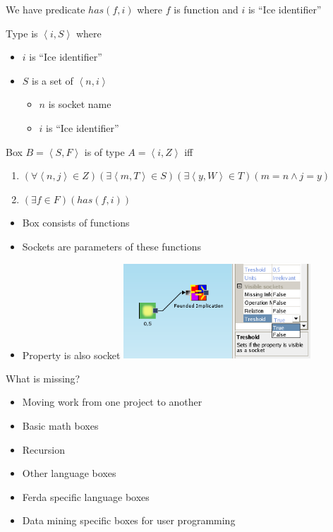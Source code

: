 \documentclass[a4paper,12pt]{book}
\begin{document}
We have predicate $has(f,i)$ where $f$ is function and $i$ is ``Ice identifier''

Type is $\left<i,S\right>$ where
\begin{itemize}
	\item $i$ is ``Ice identifier''
	\item $S$ is a set of $\left<n,i\right>$
	\begin{itemize}
		\item $n$ is socket name
		\item $i$ is ``Ice identifier''
	\end{itemize}
\end{itemize}

Box $B=\left<S,F\right>$ is of type $A=\left<i,Z\right>$ iff 
\begin{enumerate}
	\item $(\forall \left<n,j\right>\in Z)(\exists \left<m,T\right>\in S)(\exists \left<y,W\right>\in T)(m=n \wedge j=y)$
	\item $(\exists f\in F)(has(f,i))$
\end{enumerate}
	
\begin{itemize}
	\item Box consists of functions
	\item Sockets are parameters of these functions
	\item Property is also socket
		\includegraphics[width=7cm]{property_as_socket}
\end{itemize}

What is missing?
\begin{itemize}
	\item Moving work from one project to another
	\item Basic math boxes
	\item Recursion
	\item Other language boxes
	\item Ferda specific language boxes
	\item Data mining specific boxes for user programming
\end{itemize}
\end{document}
